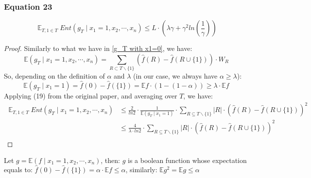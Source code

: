 \documentclass{article}
\begin{document}
			\subsubsection{Equation 23}
				\begin{equation}
					\mathop{\mathbb{E}}_{T,1 \in T} Ent \left( g_T \mid x_1 = 1,x_2, \cdots, x_n \right) \leq L \cdot \left( \lambda \gamma + \gamma^2 ln \left( \frac{1}{\gamma} \right) \right)
				\end{equation}
				\begin{proof}
					Similarly to what we have in \ref{g_T with x1=0}, we have:
					\begin{equation} \label{g_T with x1=1}
						\mathbb{E} \left( g_T \mid x_1 = 1,x_2, \cdots, x_n \right) = \sum_{R \subset T \backslash \{1\}} \left( \hat{f}(R) - \hat{f}(R \cup \{1\}) \right) \cdot W_R
					\end{equation}
					So, depending on the definition of $\alpha$ and $\lambda$ (in our case, we always have $\alpha \geq \lambda$):
					\begin{equation}
						\mathbb{E} \left( g_T \mid x_1=1 \right) = \hat{f} (0) - \hat{f} (\{1\}) = \mathbb{E}f \cdot \left( 1 - \left (1- \alpha \right) \right) \geq \lambda \cdot \mathbb{E} f
					\end{equation}
					Applying (19) from the original paper, and averaging over $T$, we have:
					\begin{equation} \begin{aligned}
						\mathop{\mathbb{E}}_{T,1 \in T} Ent \left( g_T \mid x_1 = 1,x_2, \cdots, x_n \right) 
						& \leq \frac{2}{ln 2} \cdot \frac{1}{\mathbb{E} \left( g_T \mid x_1=1 \right)} \cdot \sum_{R \subseteq {T\backslash \{1\}}} |R| \cdot \left( \hat{f} (R) - \hat{f} (R \cup \{1\}) \right)^2 \\
						& \leq \frac{4}{\lambda \cdot ln 2} \cdot \sum_{R \subseteq {T\backslash \{1\}}} |R| \cdot \left( \hat{f} (R) - \hat{f} (R \cup \{1\}) \right)^2 \\ 
					\end{aligned} 
					\end{equation}
				\end{proof}
				Let $g = \mathbb{E} \left( f \mid x_1 = 1,x_2, \cdots, x_n \right)$, then: $g$ is a boolean function whose expectation equals to: $ \hat{f}(0) - \hat{f}(\{1\}) = \alpha \cdot \mathbb{E} f \leq \alpha $, similarly: $ \mathbb{E}g^2 = \mathbb{E}g \leq \alpha$
\end{document}
